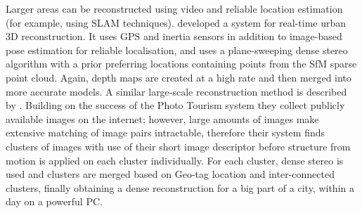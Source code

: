 Larger areas can be reconstructed using video and reliable location estimation (for example, using SLAM techniques).  developed a system for real-time urban 3D reconstruction. It uses GPS and inertia sensors in addition to image-based pose estimation for reliable localisation, and uses a plane-sweeping dense stereo algorithm with a prior preferring locations containing points from the SfM sparse point cloud. Again, depth maps are created at a high rate and then merged into more accurate models. A similar large-scale reconstruction method is described by . Building on the success of the Photo Tourism system \cite{Snavely2006} they collect publicly available images on the internet; however, large amounts of images make extensive matching of image pairs intractable, therefore their system finds clusters of images with use of their short image descriptor before structure from motion is applied on each cluster individually. For each cluster, dense stereo is used and clusters are merged based on Geo-tag location and inter-connected clusters, finally obtaining a dense reconstruction for a big part of a city, within a day on a powerful PC.


